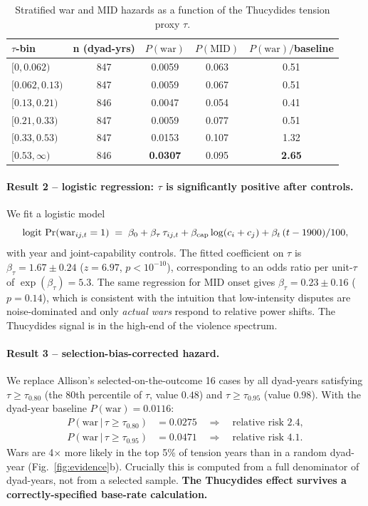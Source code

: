 \documentclass[11pt]{article}
\begin{document}
\begin{table}[h]
\centering\small
\begin{tabular}{lcccc}
\toprule
$\tau$-bin & n (dyad-yrs) & $P(\text{war})$ & $P(\text{MID})$ & $P(\text{war})/$baseline \\
\midrule
$[0,0.062)$    & 847 & 0.0059 & 0.063 & 0.51 \\
$[0.062,0.13)$ & 847 & 0.0059 & 0.067 & 0.51 \\
$[0.13,0.21)$  & 846 & 0.0047 & 0.054 & 0.41 \\
$[0.21,0.33)$  & 847 & 0.0059 & 0.077 & 0.51 \\
$[0.33,0.53)$  & 847 & 0.0153 & 0.107 & 1.32 \\
$[0.53,\infty)$ & 846 & \textbf{0.0307} & 0.095 & \textbf{2.65} \\
\bottomrule
\end{tabular}
\caption{Stratified war and MID hazards as a function of the Thucydides
tension proxy $\tau$.}
\label{tab:T1}
\end{table}

\paragraph*{Result 2 -- logistic regression: $\tau$ is significantly
positive after controls.}
We fit a logistic model
\begin{equation}
\mathrm{logit}\,\Pr(\text{war}_{ij,t}=1) \;=\;
\beta_0 + \beta_\tau\,\tau_{ij,t} + \beta_{\rm cap}\log(c_i+c_j) +
\beta_t \,(t-1900)/100,
\label{eq:logit}
\end{equation}
with year and joint-capability controls. The fitted coefficient on
$\tau$ is $\beta_\tau = 1.67 \pm 0.24$ ($z = 6.97$, $p<10^{-10}$),
corresponding to an odds ratio per unit-$\tau$ of $\exp(\beta_\tau)
\!=\!5.3$. The same regression for MID onset gives $\beta_\tau = 0.23
\pm 0.16$ ($p=0.14$), which is consistent with the intuition that
low-intensity disputes are noise-dominated and only \emph{actual wars}
respond to relative power shifts. The Thucydides signal is in the
high-end of the violence spectrum.

\paragraph*{Result 3 -- selection-bias-corrected hazard.}
We replace Allison's selected-on-the-outcome 16 cases by all dyad-years
satisfying $\tau \geq \tau_{0.80}$ (the 80th percentile of $\tau$, value
$0.48$) and $\tau \geq \tau_{0.95}$ (value $0.98$). With the dyad-year
baseline $P(\text{war}) = 0.0116$:
\begin{align*}
P(\text{war}\,|\,\tau\!\geq\!\tau_{0.80}) &= 0.0275 \quad\Rightarrow\quad
\text{relative risk } 2.4, \\
P(\text{war}\,|\,\tau\!\geq\!\tau_{0.95}) &= 0.0471 \quad\Rightarrow\quad
\text{relative risk } 4.1.
\end{align*}
Wars are 4$\times$ more likely in the top 5\% of tension years than in a
random dyad-year (Fig.~\ref{fig:evidence}b). Crucially this is computed
from a full denominator of dyad-years, not from a selected sample.
\textbf{The Thucydides effect survives a correctly-specified base-rate
calculation.}
\end{document}
